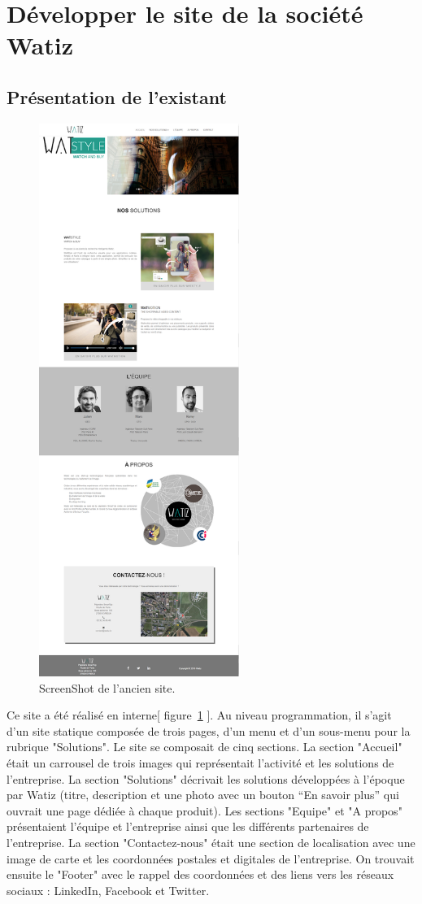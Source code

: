 \documentclass[a4paper, 12pt]{report}
\begin{document}
\section{Développer le site de la société Watiz}
\subsection{Présentation de l’existant}
\begin{figure}
\captionsetup{font=small}
\centering
\includegraphics[height=18cm]{images/Watiz_WebSite_Home.png}
\caption{\label{fig:4.7}ScreenShot de l'ancien site.}
\end{figure}
Ce site a été réalisé en interne[ figure~\ref{fig:4.7} ].
Au niveau programmation, il s’agit d’un site statique composée de trois pages, d’un menu et d’un sous-menu pour la rubrique "Solutions".
Le site se composait de cinq sections. La section "Accueil" était un carrousel de trois images qui représentait l'activité et les solutions de l'entreprise.
La section "Solutions" décrivait les solutions développées à l'époque par Watiz (titre, description et une photo avec un bouton “En savoir plus” qui ouvrait une page dédiée à chaque produit).
Les sections "Equipe" et "A propos" présentaient l'équipe et l’entreprise ainsi que les différents partenaires de l'entreprise.
La section "Contactez-nous" était une section de localisation avec une image de carte et les coordonnées postales et digitales de l'entreprise. On trouvait ensuite le "Footer" avec le rappel des coordonnées et des liens vers les réseaux sociaux : LinkedIn, Facebook et Twitter.
\end{document}
